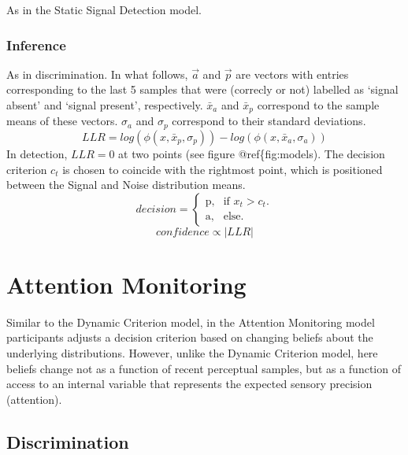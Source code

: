 \documentclass[12pt,twoside]{reedthesis}
\begin{document}
As in the Static Signal Detection model.

\hypertarget{inference-5}{%
\subsubsection*{Inference}\label{inference-5}}

As in discrimination. In what follows, \(\vec{a}\) and \(\vec{p}\) are vectors with entries corresponding to the last 5 samples that were (correcly or not) labelled as `signal absent' and `signal present', respectively. \(\bar{x}_{a}\) and \(\bar{x}_{p}\) correspond to the sample means of these vectors. \(\sigma_{a}\) and \(\sigma_{p}\) correspond to their standard deviations.
\begin{equation}
LLR = log(\phi(x,\bar{x}_{p},\sigma_{p}))-log(\phi(x,\bar{x}_{a},\sigma_{a}))
\end{equation}
In detection, \(LLR=0\) at two points (see figure @ref\{fig:models). The decision criterion \(c_t\) is chosen to coincide with the rightmost point, which is positioned between the Signal and Noise distribution means.
\begin{equation}
  decision=\begin{cases}
    \text{p}, & \text{if } x_t>c_t.\\
    \text{a}, & \text{else}.
  \end{cases}
\end{equation}
\begin{equation}
confidence \propto |LLR|
\end{equation}
\hypertarget{app3:Monitoring}{%
\section{Attention Monitoring}\label{app3:Monitoring}}

Similar to the Dynamic Criterion model, in the Attention Monitoring model participants adjusts a decision criterion based on changing beliefs about the underlying distributions. However, unlike the Dynamic Criterion model, here beliefs change not as a function of recent perceptual samples, but as a function of access to an internal variable that represents the expected sensory precision (attention).

\hypertarget{discrimination-3}{%
\subsection{Discrimination}\label{discrimination-3}}
\end{document}
